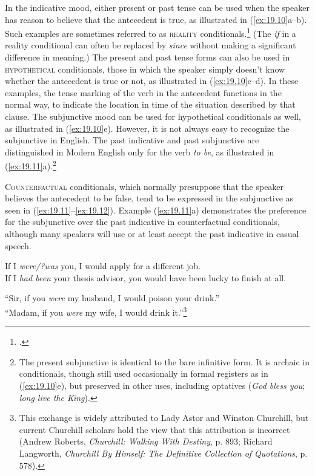 In the indicative mood, either present or past tense can be used when the speaker has reason to believe that the antecedent is true, as illustrated in (\ref{ex:19.10}a--b). Such examples are sometimes referred to as \textsc{reality} conditionals.\footnote{\citet{ThompsonEtAl2007}.} (The \textit{if} in a reality conditional can often be replaced by \textit{since} without making a significant difference in meaning.) The present and past tense forms can also be used in \textsc{hypothetical} conditionals, those in which the speaker simply doesn’t know whether the antecedent is true or not, as illustrated in (\ref{ex:19.10}c--d). In these examples, the tense marking of the verb in the antecedent functions in the normal way, to indicate the location in time of the situation described by that clause. The subjunctive mood can be used for hypothetical conditionals as well, as illustrated in (\ref{ex:19.10}e). However, it is not always easy to recognize the subjunctive in English. The past indicative and past subjunctive are distinguished in Modern English only for the verb \textit{to be}, as illustrated in (\ref{ex:19.11}a).\footnote{The present subjunctive is identical to the bare infinitive form. It is archaic in conditionals, though still used occasionally in formal registers as in (\ref{ex:19.10}e), but preserved in other uses, including optatives (\textit{God bless you}; \textit{long live the King}).}



\textsc{Counterfactual} conditionals, which normally presuppose that the speaker believes the antecedent to be false, tend to be expressed in the subjunctive as seen in (\ref{ex:19.11}--\ref{ex:19.12}). Example (\ref{ex:19.11}a) demonstrates the preference for the subjunctive over the past indicative in counterfactual conditionals, although many speakers will use or at least accept the past indicative in casual speech.


\ea \label{ex:19.11}
\ea  If I \textit{were/?was} you, I would apply for a different job.\\
\ex If I \textit{had been} your thesis advisor, you would have been lucky to finish at all.
                       \z
\z

\ea \label{ex:19.12}
“Sir, if you \textit{were} my husband, I would poison your drink.”\\
“Madam, if you \textit{were} my wife, I would drink it.”\footnote{This exchange is widely attributed to Lady Astor and Winston Churchill, but current Churchill scholars hold the view that this attribution is incorrect (Andrew Roberts, \textit{Churchill: Walking With Destiny}, p. 893; Richard Langworth, \textit{Churchill By Himself: The Definitive Collection of Quotations}, p. 578).}
\z


